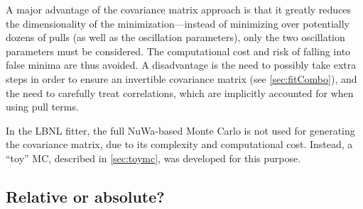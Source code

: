 \documentclass[../thesis.tex]{subfiles}
\begin{document}
\begin{comment}
Here we note that this is a linearized model, and it treats $V_{ij}$ as a constant (when in fact it is a function of the oscillation parameters). For these reasons, obtaining reliable confidence intervals requires that the likelihood function is reasonably Gaussian in shape, and that $V_{ij}$ does not vary significantly between the best-fit point and the oscillation parameters chosen when generating the matrix. In practice, for the oscillation fit, non-Gaussianity is minimal (thanks to the central limit theorem) within a sufficiently large neighborhood of the best-fit point for setting $1\sigma$ confidence intervals, and there is minimal impact from reasonable variations of the oscillation parameters used in generating $V_{ij}$.\footnote{Linearization is also implicit in the pull-term approach, in which Gaussian distributions are assumed for the pull terms. On the other hand, the pull-term approach does not require any prior assumptions on the oscillation parameters, unlike the covariance matrix approach. The agreement \cite{An_2017} between the two approaches provides a further demonstration that $V_{ij}$'s dependence on the oscillation parameters is not a practical issue. If it were, then it could be remedied using an iterative approach in which $V_{ij}$ is reevaluated at the best-fit point of the previous fit, until convergence is reached. As such, this detail of the covariance matrix approach should not be considered a fundamental and incurable flaw.}
\end{comment}
A major advantage of the covariance matrix approach is that it greatly reduces the dimensionality of the minimization---instead of minimizing over potentially dozens of pulls (as well as the oscillation parameters), only the two oscillation parameters must be considered. The computational cost and risk of falling into false minima are thus avoided. A disadvantage is the need to possibly take extra steps in order to ensure an invertible covariance matrix (see \autoref{sec:fitCombo}), and the need to carefully treat correlations, which are implicitly accounted for when using pull terms.

In the LBNL fitter, the full NuWa-based Monte Carlo is not used for generating the covariance matrix, due to its complexity and computational cost. Instead, a ``toy'' MC, described in \autoref{sec:toymc}, was developed for this purpose.

\subsection{Relative or absolute?}
\label{sec:fitRelOrAbs}
\end{document}
